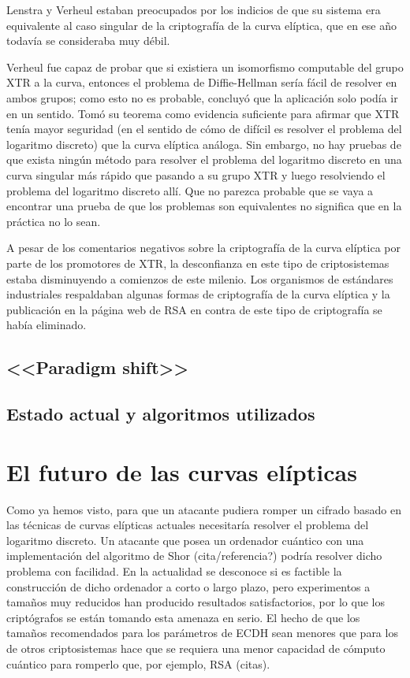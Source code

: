 \documentclass[
  a4paper,
  12pt,
  spanish,
]{scrartcl}
\begin{document}
Lenstra y Verheul estaban preocupados por los indicios de que su sistema era equivalente al caso singular de la criptografía de la curva elíptica, que en ese año todavía se consideraba muy débil.

Verheul fue capaz de probar que si existiera un isomorfismo computable del grupo XTR a la curva, entonces el problema de Diffie-Hellman sería fácil de resolver en ambos grupos; como esto no es probable, concluyó que la aplicación solo podía ir en un sentido. Tomó su teorema como evidencia suficiente para afirmar que XTR tenía mayor seguridad (en el sentido de cómo de difícil es resolver el problema del logaritmo discreto) que la curva elíptica análoga. Sin embargo, no hay pruebas de que exista ningún método para resolver el problema del logaritmo discreto  en una curva singular más rápido que pasando a su grupo XTR y luego resolviendo el problema del logaritmo discreto allí. Que no parezca probable que se vaya a encontrar una prueba de que los problemas son equivalentes no significa que en la práctica no lo sean.

A pesar de los comentarios negativos sobre la criptografía de la curva elíptica por parte de los promotores de XTR, la desconfianza en este tipo de criptosistemas estaba disminuyendo a comienzos de este milenio. Los organismos de estándares industriales respaldaban algunas formas de criptografía de la curva elíptica y la publicación en la página web de RSA en contra de este tipo de criptografía se había eliminado.

\subsection{<<Paradigm shift>>}



\subsection{Estado actual y algoritmos utilizados}


\section{El futuro de las curvas elípticas}

Como ya hemos visto, para que un atacante pudiera romper un cifrado basado en las técnicas de curvas elípticas actuales necesitaría resolver el problema del logaritmo discreto.
Un atacante que posea un ordenador cuántico con una implementación del algoritmo de Shor (cita/referencia?) podría resolver dicho problema con facilidad. 
En la actualidad se desconoce si es factible la construcción de dicho ordenador a corto o largo plazo, pero experimentos a tamaños muy reducidos han producido resultados satisfactorios, por lo que los criptógrafos se están tomando esta amenaza en serio.
El hecho de que los tamaños recomendados para los parámetros de ECDH sean menores que para los de otros criptosistemas hace que se requiera una menor capacidad de cómputo cuántico para romperlo que, por ejemplo, RSA (citas).
\end{document}
